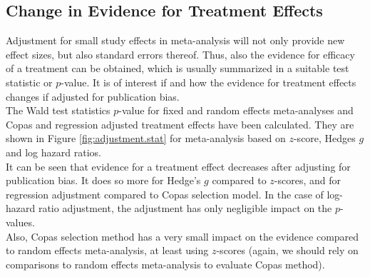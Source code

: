 \subsection{Change in Evidence for Treatment Effects} \label{sec:change.evidence}
Adjustment for small study effects in meta-analysis will not only provide new effect sizes, but also standard errors thereof. Thus, also the evidence for efficacy of a treatment can be obtained, which is usually summarized in a suitable test statistic or $p$-value. It is of interest if and how the evidence for treatment effects changes if adjusted for publication bias.\\
The Wald test statistics $p$-value for fixed and random effects meta-analyses and Copas and regression adjusted treatment effects have been calculated. They are shown in Figure \ref{fig:adjustment.stat} for meta-analysis based on $z$-score, Hedges $g$ and log hazard ratios. \\
It can be seen that evidence for a treatment effect decreases after adjusting for publication bias. It does so more for Hedge's $g$ compared to $z$-scores, and for regression adjustment compared to Copas selection model. 
In the case of log-hazard ratio adjustment, the adjustment has only negligible impact on the $p$-values. \\
Also, Copas selection method has a very small impact on the evidence compared to random effects meta-analysis, at least using $z$-scores (again, we should rely on comparisons to random effects meta-analysis to evaluate Copas method). \\ 

